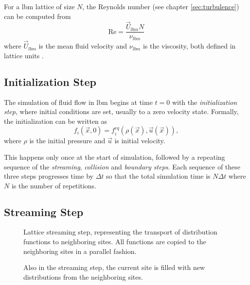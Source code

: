 For a \gls{lbm} lattice of size $N$, the Reynolds number (see chapter \ref{sec:turbulence}) can be computed from
\begin{equation}
\textrm{Re} = \frac{\vec{U}_{lbm} N}{\nu_{lbm}}
\end{equation}
where $\vec{U}_{lbm}$ is the mean fluid velocity and $\nu_{lbm}$ is the viscosity, both defined in lattice units \cites[pg.118]{Delbosc}.

\subsection{Initialization Step}
The simulation of fluid flow in \gls{lbm} begins at time $t=0$ with the \textit{initialization step}, where initial conditions are set, usually to a zero velocity state. Formally, the initialization can be written as~\cites[pg.58]{Delbosc}
\begin{equation}
f_i(\vec{x},0) = f_i^{eq} (\rho (\vec{x}), \vec{u} (\vec{x})),
\end{equation}
where $\rho$ is the initial pressure and $\vec{u}$ is initial velocity.

This happens only once at the start of simulation, followed by a repeating sequence of the \textit{streaming}, \textit{collision} and \textit{boundary steps}. Each sequence of these three steps progresses time by $\Delta t$ so that the total simulation time is $N\Delta t$ where $N$ is the number of repetitions.

\subsection{Streaming Step}
\begin{figure}[!htb]
\centering
\begin{minipage}[t]{.45\textwidth}
	\centering
	\begin{small}
	\def\svgwidth{0.9\linewidth}
	
	\end{small}
	\caption{Lattice streaming step, representing the transport of distribution functions to neighboring sites. All functions are copied to the neighboring sites in a parallel fashion.}
	\label{fig:d2q9_3}
\end{minipage}\qquad%
\begin{minipage}[t]{.45\textwidth}
	\centering
	\begin{small}
	\def\svgwidth{0.9\linewidth}
	
	\end{small}
	\caption{Also in the streaming step, the current site is filled with new distributions from the neighboring sites.}
	\label{fig:d2q9_4}
\end{minipage}
\end{figure}

